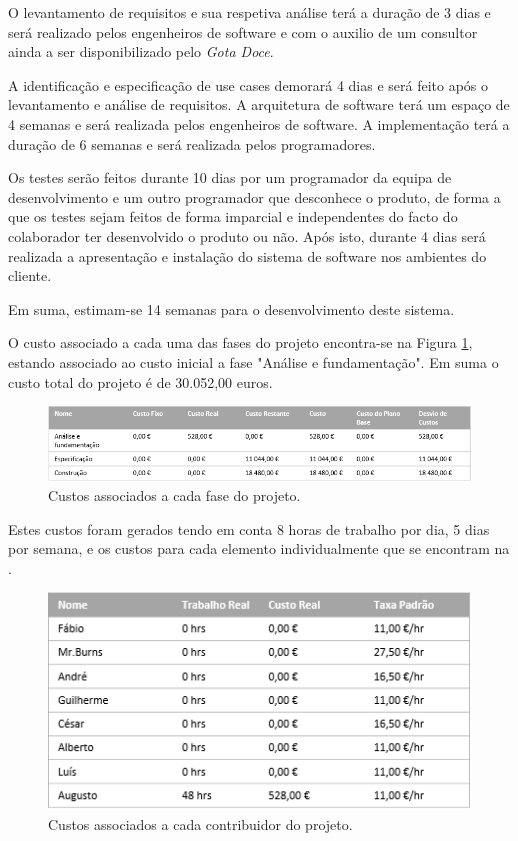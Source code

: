 O levantamento de requisitos e sua respetiva análise terá a duração de 3 dias e será realizado pelos engenheiros de software e com o auxilio de um consultor ainda a ser disponibilizado pelo \emph{Gota Doce}.

A identificação e especificação de use cases demorará 4 dias e será feito após o levantamento e análise de requisitos. A arquitetura de software terá um espaço de 4 semanas e será realizada pelos engenheiros de software. A implementação terá a duração de 6 semanas e será realizada pelos programadores.

Os testes serão feitos durante 10 dias por um programador da equipa de desenvolvimento e um outro programador que desconhece o produto, de forma a que os testes sejam feitos de forma imparcial e independentes do facto do colaborador ter desenvolvido o produto ou não. Após isto, durante 4 dias será realizada a apresentação e instalação do sistema de software nos ambientes do cliente.

Em suma, estimam-se 14 semanas para o desenvolvimento deste sistema.

O custo associado a cada uma das fases do projeto encontra-se na Figura \ref{fig:planeamento:custosgerais}, estando associado ao custo inicial a fase "Análise e fundamentação". Em suma o custo total do projeto é de 30.052,00 euros.

\begin{figure}[ht]
  \centering
  \includegraphics[width=\textwidth]{figures/03/planeamento-custos.png}
  \caption{Custos associados a cada fase do projeto.}
  \label{fig:planeamento:custosgerais}
\end{figure}

Estes custos foram gerados tendo em conta 8 horas de trabalho por dia, 5 dias por semana, e os custos para cada elemento individualmente que se encontram na .

\begin{figure}[ht]
  \centering
  \includegraphics[scale=1.15]{figures/03/planeamento-recursos.png}
  \caption{Custos associados a cada contribuidor do projeto.}
  \label{fig:planeamento:recursoshumanos}
\end{figure}

